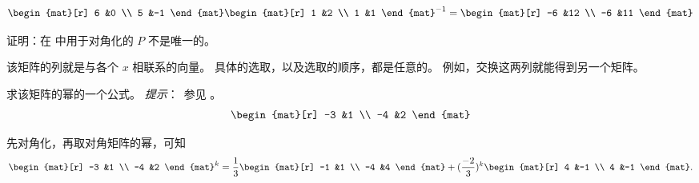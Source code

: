 \begin{answer}
\begin{exparts}
\begin{equation*}
\begin{mat}[r]
              6  &0  \\
              5  &-1
            \end{mat}
            \begin{mat}[r]
              1  &2  \\
              1  &1
            \end{mat}^{-1}
            =
            \begin{mat}[r]
              -6  &12  \\
              -6  &11
            \end{mat}
          \end{equation*}
     \end{exparts}
   \end{answer}
  \item 
    证明：在 
    中用于对角化的 $P$ 不是唯一的。
    \begin{answer}
      该矩阵的列就是与各个 $x$ 相联系的向量。
      具体的选取，以及选取的顺序，都是任意的。
      例如，交换这两列就能得到另一个矩阵。
    \end{answer}
  \item 
    求该矩阵的幂的一个公式。
    \textit{提示}：~参见 。
    \begin{equation*}
      \begin{mat}[r]
        -3  &1  \\
        -4  &2
      \end{mat}
    \end{equation*}
    \begin{answer}
      先对角化，再取对角矩阵的幂，可知
      \begin{equation*}
        \begin{mat}[r]
          -3  &1  \\
          -4  &2
        \end{mat}^k
        =
        \frac{1}{3}
        \begin{mat}[r]
          -1  &1  \\
          -4  &4
        \end{mat}
        +(\frac{-2}{3})^k
        \begin{mat}[r]
           4  &-1 \\
           4  &-1
        \end{mat}.
      \end{equation*}  
     \end{answer}
  \item 
